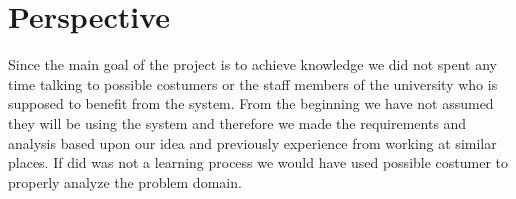 \chapter{Perspective}
\label{chap:perspective}




Since the main goal of the project is to achieve knowledge we did not spent any time talking to possible costumers or the staff members of the university who is supposed to benefit from the system. From the beginning we have not assumed they will be using the system and therefore we made the requirements and analysis based upon our idea and previously experience from working at similar places. 
If did was not a learning process we would have used possible costumer to properly analyze the problem domain. 

